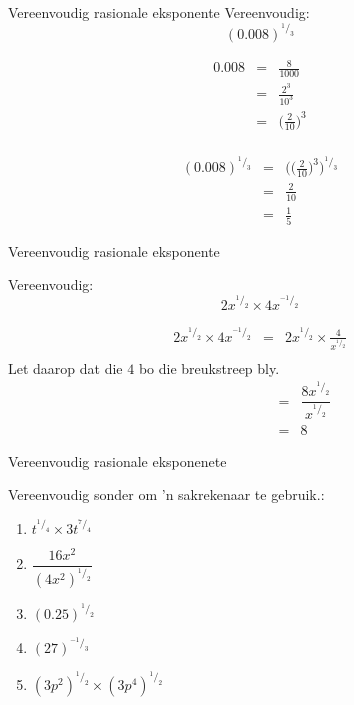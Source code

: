 \begin{wex}
{%
Vereenvoudig rasionale eksponente
} 
{%
Vereenvoudig: 
$$ (0.008)^{^1/_3} $$
}
{%

\begin{eqnarray*}
 0.008 & = & \frac{8}{1000} \\
       & = & \frac{2^3}{10^3} \\
       & = & \Big(\frac{2}{10}\Big)^3\\
\end{eqnarray*}

\begin{eqnarray*}
 (0.008)^{^1/_3} & = & \Big(\Big(\frac{2}{10}\Big)^3\Big)^{^1/_3} \\
		 & = & \frac{2}{10} \\
		 & = & \frac{1}{5}
\end{eqnarray*}
}
\end{wex}

\begin{wex}
{%
Vereenvoudig rasionale eksponente 
}

{
Vereenvoudig:
$$ 2x^{^1/_2} \times 4x^{^{-1}/_{2}} $$
}
{%
\begin{eqnarray*}
 2x^{^1/_2} \times 4x^{^{-1}/_{2}} & = & 2x^{^1/_2} \times \frac{4}{x^{^1/_2}} \\
\end{eqnarray*}
Let daarop dat die $4$ bo die breukstreep bly.\\

\begin{eqnarray*}
 \phantom{2x^{^1/_2} \times 4x^{^{-1}/_{2}}} & = & \dfrac{8x^{^1/_2}}{x^{^1/_2}} \\
					     & = & 8
\end{eqnarray*}


}
\end{wex}

\begin{exercises}{Vereenvoudig rasionale eksponenete}
{
Vereenvoudig sonder om ’n sakrekenaar te gebruik.:
\begin{multicols}{2}
\begin{enumerate}[noitemsep, label=\textbf{\arabic*}., itemsep=5pt]
 \item $ t^{^1/_4} \times 3t^{^7/_4} $
 \item $ \dfrac{16x^2}{(4x^2)^{^1/_2}} $
 \item $ (0.25)^{^1/_2} $
 \item $ (27)^{^{-1}/_3} $
 \item $ (3p^2)^{^1/_2} \times (3p^4)^{^1/_2} $
\end{enumerate}
\end{multicols}

}
\end{exercises}



